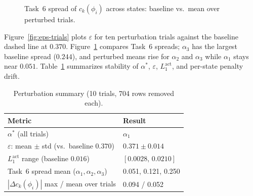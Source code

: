 \documentclass[11pt,a4paper]{article}
\begin{document}
\begin{figure}[H]
  \centering
  \caption{Task~6 spread of $c_k(\phi_i)$ across states: baseline vs.\ mean over
    perturbed trials.}
  \label{fig:spread-task6}
\end{figure}

Figure~\ref{fig:eps-trials} plots $\varepsilon$ for ten perturbation trials against
the baseline dashed line at $0.370$. Figure~\ref{fig:spread-task6} compares Task~6
spreads; $\alpha_3$ has the largest baseline spread ($0.244$), and perturbed means
rise for $\alpha_2$ and $\alpha_3$ while $\alpha_1$ stays near $0.051$.
Table~\ref{tab:perturb-summary} summarizes stability of $\alpha^\ast$, $\varepsilon$,
$L_1^{\mathrm{act}}$, and per-state penalty drift.

\begin{table}[htbp]
  \centering
  \caption{Perturbation summary (10 trials, 704 rows removed each).}
  \label{tab:perturb-summary}
  \begin{tabular}{@{}ll@{}}
    \toprule
    \textbf{Metric} & \textbf{Result} \\
    \midrule
    $\alpha^\ast$ (all trials) & $\alpha_1$ \\
    $\varepsilon$: mean $\pm$ std (vs.\ baseline $0.370$) & $0.371 \pm 0.014$ \\
    $L_1^{\mathrm{act}}$ range (baseline $0.016$) & $[0.0028,\,0.0210]$ \\
    Task~6 spread mean ($\alpha_1,\alpha_2,\alpha_3$) & 0.051, 0.121, 0.250 \\
    $|\Delta c_k(\phi_i)|$ max / mean over trials & 0.094 / 0.052 \\
    \bottomrule
  \end{tabular}
\end{table}
\end{document}
